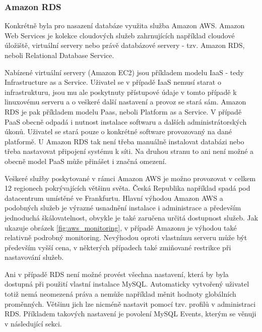 \documentclass[thesis=B,czech]{FITthesis}[2012/06/26]
\begin{document}
\subsubsection{Amazon RDS}
\label{amazon-aws}
	Konkrétně byla pro nasazení databáze využita služba Amazon AWS\cite{gghjjkk}. Amazon Web Services je kolekce cloudových služeb zahrnujících například cloudové úložiště, virtuální servery nebo právě databázové servery - tzv. Amazon RDS, neboli Relational Database Service. 
	
	Nabízené virtuální servery (Amazon EC2) jsou příkladem modelu IaaS - tedy Infrastructure as a Service. Uživatel se v případě IaaS nemusí starat o infrastrukturu, jsou mu ale poskytnuty přístupové údaje v tomto případě k linuxovému serveru a o veškeré další nastavení a provoz se stará sám. Amazon RDS je pak příkladem modelu Paas, neboli Platform as a Service. V případě PaaS obecně odpadá i nutnost instalace softwaru a dalších administrátorských úkonů. Uživatel se stará pouze o konkrétné software provozovaný na dané platformě. U Amazon RDS tak není třeba manuálně instalovat databázi nebo třeba nastavovat připojení systému k síti. Na druhou stranu to ani není možné a obecně model PaaS může přinášet i značná omezení. 
	
	Veškeré služby poskytované v rámci Amazon AWS je možno provozovat v celkem 12 regionech pokrývajících většinu světa. Česká Republika například spadá pod datacentrum umístěné ve Frankfurtu. Hlavní výhodou Amazon AWS a podobných služeb je výrazné usnadnění instalace i administrace a především jednoduchá škálovatelnost, obvykle je také zaručena určitá dostupnost služeb. Jak ukazuje obrázek \ref{fig:aws_monitoring}, v případě Amazonu je výhodou také relativně podrobný monitoring. Nevýhodou oproti vlastnímu serveru může být především vyšší cena, v některých případech také zmiňované restrikce při nastavování služeb. 
	
	Ani v případě RDS není možné provést všechna nastavení, která by byla dostupná při použití vlastní instalace MySQL. Automaticky vytvořený uživatel totiž nemá neomezená práva a nemůže například měnit hodnoty globálních proměnných. Většinu jich lze nicméně nastavit pomocí tzv. profilů v administraci RDS. Příkladem takových nastavení je povolení MySQL Events, kterým se věnuji v následující sekci. 
\end{document}
